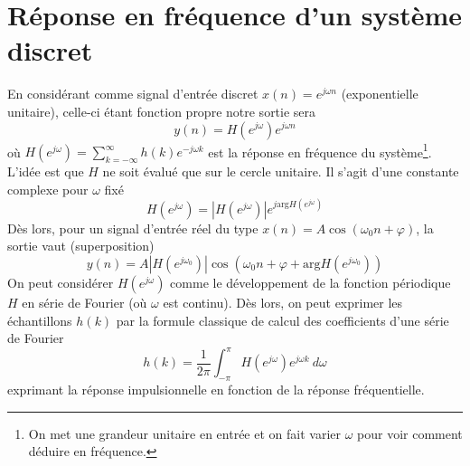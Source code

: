 \section{Réponse en fréquence d'un système discret}
En considérant comme signal d'entrée discret $x(n) = e^{j\omega n}$ (exponentielle unitaire), 
celle-ci étant fonction propre notre sortie sera
\begin{equation}
y(n) = H\left(e^{j\omega }\right)e^{j\omega n}
\end{equation}
où $\displaystyle H\left(e^{j\omega }\right) = \sum_{k=-\infty}^\infty h(k)e^{-j
\omega k}$ est la réponse en fréquence du système\footnote{On met une grandeur unitaire 
en entrée et on fait varier $\omega$ pour voir comment déduire en fréquence.}. L'idée 
est que $H$ ne soit évalué que sur le cercle unitaire. Il s'agit d'une constante complexe 
pour $\omega$ fixé
\begin{equation}
H\left(e^{j\omega }\right) = \left|H\left(e^{j\omega }\right)\right|e^{j\text{arg} 
H\left(e^{j\omega }\right)}
\end{equation}
Dès lors, pour un signal d'entrée réel du type $x(n) = A\cos(\omega_0n+\varphi)$, la 
sortie vaut (superposition)
\begin{equation}
y(n) = A \left|H\left(e^{j\omega_0 }\right)\right|\cos\left(\omega_0n+\varphi+\text{arg} 
H\left(e^{j\omega_0}\right)\right)
\end{equation}
On peut considérer $H\left(e^{j\omega}\right)$ comme le développement de la fonction 
périodique $H$ en série de Fourier (où $\omega$ est continu). Dès lors, on peut exprimer 
les échantillons $h(k)$ par la formule classique de calcul des coefficients d'une série 
de Fourier
\begin{equation}
h(k) = \frac{1}{2\pi}\int_{-\pi}^\pi H\left(e^{j\omega }\right)e^{j\omega k}\ d\omega
\end{equation}
exprimant la réponse impulsionnelle en fonction de la réponse fréquentielle.



\newpage
